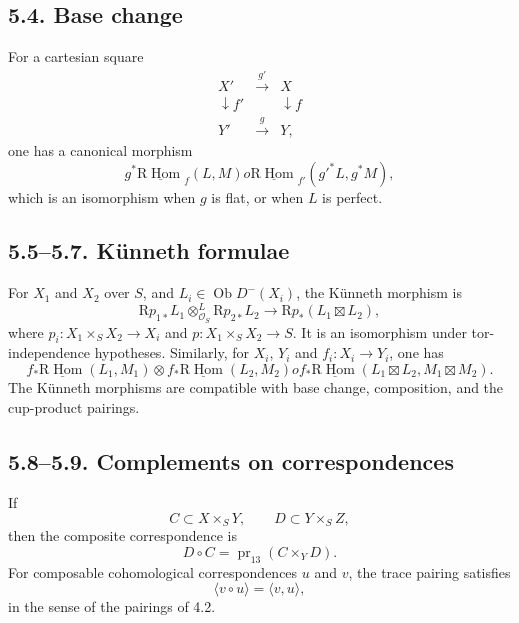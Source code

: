 \documentclass[12pt]{article}
\newcommand{\Hom}{\operatorname{Hom}}
\newcommand{\pr}{\operatorname{pr}}
\newcommand{\ob}{\operatorname{Ob}}
\newcommand{\R}{\mathrm R}
\newcommand{\cO}{\mathcal O}
\begin{document}
\subsection*{5.4. Base change}
For a cartesian square
\[
\begin{array}{ccc}
X' & \xrightarrow{g'} & X \\
\downarrow f' & & \downarrow f \\
Y' & \xrightarrow{g} & Y,
\end{array}
\]
one has a canonical morphism
\begin{equation}
   g^*\underline{\R\Hom}_f(L,M)	o
   \underline{\R\Hom}_{f'}(g'^*L,g^*M),
   \tag{5.4.1}
\end{equation}
which is an isomorphism when $g$ is flat, or when $L$ is perfect.

\subsection*{5.5--5.7. Künneth formulae}
For $X_1$ and $X_2$ over $S$, and $L_i\in\ob D^{-}(X_i)$, the Künneth morphism is
\begin{equation}
   \R p_{1*}L_1\otimes^L_{\cO_S}\R p_{2*}L_2
      \longrightarrow \R p_*(L_1\boxtimes L_2),
   \tag{5.5.1}
\end{equation}
where $p_i:X_1\times_S X_2\to X_i$ and $p:X_1\times_S X_2\to S$. It is an isomorphism under tor-independence hypotheses. Similarly, for $X_i$, $Y_i$ and $f_i:X_i\to Y_i$, one has
\begin{equation}
   f_*\underline{\R\Hom}(L_1,M_1)\otimes
   f_*\underline{\R\Hom}(L_2,M_2)	o
   f_*\underline{\R\Hom}(L_1\boxtimes L_2,M_1\boxtimes M_2).
   \tag{5.6.1}
\end{equation}
The Künneth morphisms are compatible with base change, composition, and the cup-product pairings.

\subsection*{5.8--5.9. Complements on correspondences}
If
\[
   C\subset X\times_S Y,
   \qquad
   D\subset Y\times_S Z,
\]
then the composite correspondence is
\[
   D\circ C=\pr_{13}(C\times_YD).
\]
For composable cohomological correspondences $u$ and $v$, the trace pairing satisfies
\begin{equation}
   \langle v\circ u\rangle=\langle v,u\rangle,
   \tag{5.9.1}
\end{equation}
in the sense of the pairings of 4.2.
\end{document}

